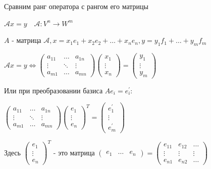 \documentclass[12pt]{article}
\begin{document}
    \Nota Сравним ранг оператора с рангом его матрицы

    $\mathcal{A} x = y \quad \mathcal{A} : V^n \rightarrow W^m$

    $A$ - матрица $\mathcal{A}, x = x_1 e_1 + x_2 e_2 + \dots + x_n e_n, y = y_1 f_1 + \dots + y_m f_m$

    $\mathcal{A}x = y \Longleftrightarrow \begin{pmatrix}
         a_{11} & \dots & a_{1n} \\
         \vdots & \ddots & \vdots \\
         a_{m1} & \dots & a_{mn}
    \end{pmatrix} \begin{pmatrix}
         x_1 \\
         \vdots \\
         x_n
    \end{pmatrix} = \begin{pmatrix}
         y_1 \\
         \vdots \\
         y_m
    \end{pmatrix}$

    Или при преобразовании базиса $Ae_i = e^\prime_i$:

    $\begin{pmatrix}
         a_{11} & \dots & a_{1n} \\
         \vdots & \ddots & \vdots \\
         a_{m1} & \dots & a_{mn}
    \end{pmatrix} \begin{pmatrix}
         e_1 \\
         \vdots \\
         e_n
    \end{pmatrix}^T = \begin{pmatrix}
         e_1^\prime \\
         \vdots \\
         e_m^\prime
    \end{pmatrix}$

    Здесь $\begin{pmatrix}
         e_1 \\
         \vdots \\
         e_n
    \end{pmatrix}^T$ - это матрица $\begin{pmatrix}
         e_1 & \dots & e_n
    \end{pmatrix} = \begin{pmatrix}
         e_{11} & e_{12} & \dots \\
         \vdots & \vdots & \vdots \\
         e_{n1} & e_{n2} & \dots
    \end{pmatrix}$
\end{document}

